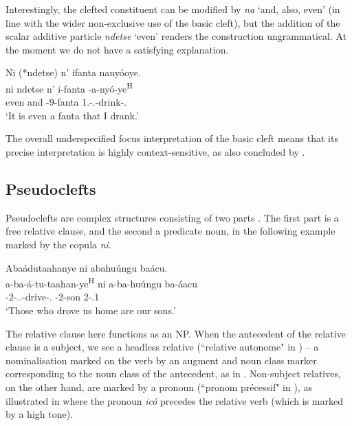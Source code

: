\documentclass[output=paper]{langscibook}
\begin{document}
Interestingly, the clefted constituent can be modified by \textit{na} ‘and, also, even’ (in line with the wider non-exclusive use of the basic cleft), but the addition of the scalar additive particle \textit{ndetse} ‘even’ renders the construction ungrammatical. At the moment we do not have a satisfying explanation.

\ea
Ni (*ndetse) n’ ifanta nanyóoye.\\
\gll
ni  ndetse  n’  i-fanta  \N{}-a-nyó-ye\textsuperscript{H}\\
\COP{}  even  and  \AUG{}-9-fanta  1\SG.\SM-\N.\PST{}-drink-\PFV.\REL{}\\
\glt
‘It is even a fanta that I drank.’\\

\z

The overall underspecified focus interpretation of the basic cleft means that its precise interpretation is highly context-sensitive, as also concluded by \citet{LafkiouiEtAl2016}.

\subsection{Pseudoclefts}

Pseudoclefts are complex structures consisting of two parts \citep{DenDikken2017,Apothéloz2012,Roubaud2000}. The first part is a free relative clause, and the second a predicate noun, in the following example marked by the copula \textit{ni}.


\ea
Abaádutaahanye ni abahuúngu baácu.\\
\gll
a-ba-á-tu-taahan-ye\textsuperscript{H}  ni  a-ba-huúngu  ba-áacu\\
\AUG{}-2-\RMT.\PL.\OM{}-drive-\PFV.\REL{}  \COP{}  \AUG{}-2-son  2-\POSS.1\PL{}\\
\glt
‘Those who drove us home are our sons.’\\

\z


The relative clause here functions as an NP. When the antecedent of the relative clause is a subject, we see a headless relative (``relative autonome" in \citealt[133]{Meeussen1959}) – a nominalisation marked on the verb by an augment and noun class marker corresponding to the noun class of the antecedent, as in . Non\hyp subject relatives, on the other hand, are marked by a pronoun (``pronom précessif" in \citealt{Meeussen1959}), as illustrated in  where the pronoun \textit{icó} precedes the relative verb (which is marked by a high tone).
\end{document}
